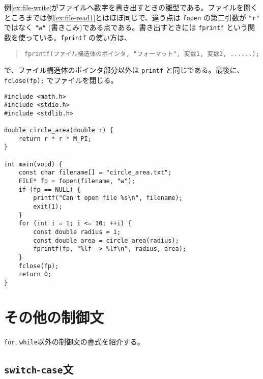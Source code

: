 例\ref{ex:file-write}がファイルへ数字を書き出すときの雛型である。ファイルを開くところまでは例\ref{ex:file-read1}とはほぼ同じで、違う点は \texttt{fopen} の第二引数が \texttt{"r"} ではなく \texttt{"w"} (書きこみ)である点である。書き出すときには \texttt{fprintf} という関数を使っている。\texttt{fprintf} の使い方は、
\begin{quote}
    \begin{verbatim}
fprintf(ファイル構造体のポインタ, "フォーマット", 変数1, 変数2, ......);
\end{verbatim}
\end{quote}
で、ファイル構造体のポインタ部分以外は \texttt{printf} と同じである。最後に、\texttt{fclose(fp);} でファイルを閉じる。
\begin{reidai}\label{ex:file-write}
    \begin{verbatim}
#include <math.h>
#include <stdio.h>
#include <stdlib.h>

double circle_area(double r) {
    return r * r * M_PI;
}

int main(void) {
    const char filename[] = "circle_area.txt";
    FILE* fp = fopen(filename, "w");
    if (fp == NULL) {
        printf("Can't open file %s\n", filename);
        exit(1);
    }
    for (int i = 1; i <= 10; ++i) {
        const double radius = i;
        const double area = circle_area(radius);
        fprintf(fp, "%lf -> %lf\n", radius, area);
    }
    fclose(fp);
    return 0;
}
\end{verbatim}
\end{reidai}

\section{その他の制御文}

\texttt{for}, \texttt{while}以外の制御文の書式を紹介する。

\subsection{\texttt{switch}-\texttt{case}文}


